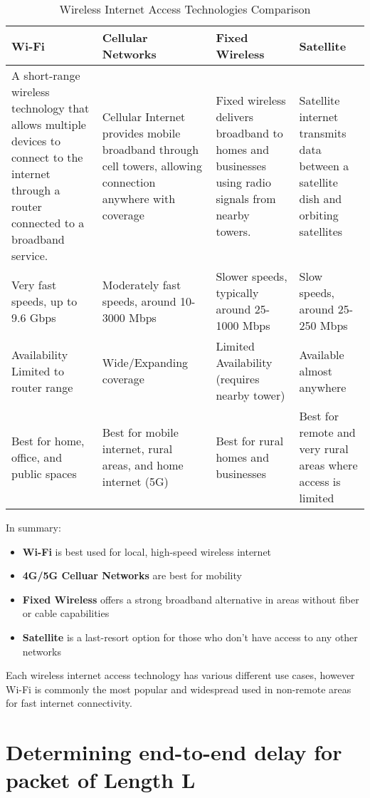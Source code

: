 \documentclass{article}
\begin{document}
\begin{table}[H]
    \centering
    \begin{tabular}{|p{3.5cm}|p{3.5cm}|p{3.5cm}|p{3.5cm}|}
        \hline
        \textbf{Wi-Fi} & \textbf{Cellular Networks} & \textbf{Fixed Wireless} & \textbf{Satellite} \\
        \hline 
        A short-range wireless technology that allows multiple devices to connect to the internet through a router connected to a broadband service.
        & Cellular Internet provides mobile broadband through cell towers, allowing connection anywhere with coverage
        & Fixed wireless delivers broadband to homes and businesses using radio signals from nearby towers.
        & Satellite internet transmits data between a satellite dish and orbiting satellites \\
        \hline
        Very fast speeds, up to 9.6 Gbps
        & Moderately fast speeds, around 10-3000 Mbps
        & Slower speeds, typically around 25-1000 Mbps
        & Slow speeds, around 25-250 Mbps \\
        \hline
        Availability Limited to router range
        & Wide/Expanding coverage
        & Limited Availability (requires nearby tower)
        & Available almost anywhere \\
        \hline
        Best for home, office, and public spaces
        & Best for mobile internet, rural areas, and home internet (5G)
        & Best for rural homes and businesses
        & Best for remote and very rural areas where access is limited \\
        \hline
    \end{tabular}
    \caption{Wireless Internet Access Technologies Comparison}
    \label{tab:my_label}
\end{table}

In summary: \begin{itemize}
    \item \textbf{Wi-Fi} is best used for local, high-speed wireless internet
    \item \textbf{4G/5G Celluar Networks} are best for mobility
    \item \textbf{Fixed Wireless} offers a strong broadband alternative in areas without fiber or cable capabilities
    \item \textbf{Satellite} is a last-resort option for those who don't have access to any other networks
\end{itemize}
Each wireless internet access technology has various different use cases, however Wi-Fi is commonly the most popular and widespread used in non-remote areas for fast internet connectivity.

\section{Determining end-to-end delay for packet of Length L}
\end{document}
